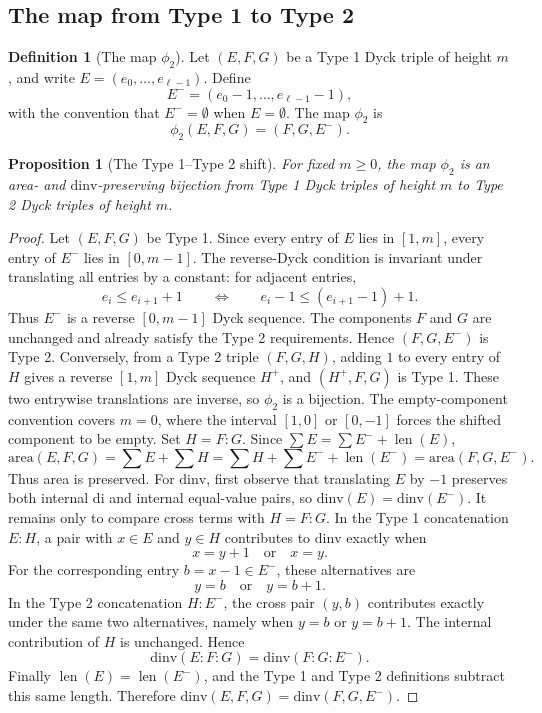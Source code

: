 \documentclass[11pt]{article}
\theoremstyle{plain}
\newtheorem{proposition}[theorem]{Proposition}
\theoremstyle{definition}
\newtheorem{definition}[theorem]{Definition}
\theoremstyle{remark}
\newcommand{\di}{\mathrm{di}}
\newcommand{\dinv}{\mathrm{dinv}}
\newcommand{\area}{\mathrm{area}}
\begin{document}
\subsection{The map from Type 1 to Type 2}
\begin{definition}[The map \(\phi_2\)]
\label{def:phi2}
Let \((E,F,G)\) be a Type 1 Dyck triple of height \(m\), and write
\(E=(e_0,\ldots,e_{\ell-1})\).  Define
\[
  E^-=(e_0-1,\ldots,e_{\ell-1}-1),
\]
with the convention that \(E^-=\emptyset\) when \(E=\emptyset\).  The map
\(\phi_2\) is
\[
  \phi_2(E,F,G)=(F,G,E^-).
\]
\end{definition}
\begin{proposition}[The Type 1--Type 2 shift]
\label{prop:phi2-bijection}
For fixed \(m\ge 0\), the map \(\phi_2\) is an area- and
\(\dinv\)-preserving bijection from Type 1 Dyck triples of height \(m\) to
Type 2 Dyck triples of height \(m\).
\end{proposition}
\begin{proof}
Let \((E,F,G)\) be Type 1.  Since every entry of \(E\) lies in \([1,m]\),
every entry of \(E^-\) lies in \([0,m-1]\).  The reverse-Dyck condition is
invariant under translating all entries by a constant: for adjacent entries,
\[
  e_i\le e_{i+1}+1
  \qquad\Longleftrightarrow\qquad
  e_i-1\le (e_{i+1}-1)+1.
\]
Thus \(E^-\) is a reverse \([0,m-1]\) Dyck sequence.  The components \(F\) and
\(G\) are unchanged and already satisfy the Type 2 requirements.  Hence
\((F,G,E^-)\) is Type 2.  Conversely, from a Type 2 triple \((F,G,H)\), adding
\(1\) to every entry of \(H\) gives a reverse \([1,m]\) Dyck sequence
\(H^+\), and \((H^+,F,G)\) is Type 1.  These two entrywise translations are
inverse, so \(\phi_2\) is a bijection.  The empty-component convention covers
\(m=0\), where the interval \([1,0]\) or \([0,-1]\) forces the shifted
component to be empty.
Set \(H=F:G\).  Since \(\sum E=\sum E^-+\operatorname{len}(E)\),
\[
  \area(E,F,G)=\sum E+\sum H
  =\sum H+\sum E^-+\operatorname{len}(E^-)
  =\area(F,G,E^-).
\]
Thus area is preserved.
For \(\dinv\), first observe that translating \(E\) by \(-1\) preserves both
internal \(\di\) and internal equal-value pairs, so
\(\dinv(E)=\dinv(E^-)\).  It remains only to compare cross terms with
\(H=F:G\).  In the Type 1 concatenation \(E:H\), a pair with \(x\in E\) and
\(y\in H\) contributes to \(\dinv\) exactly when
\[
  x=y+1 \quad\text{or}\quad x=y.
\]
For the corresponding entry \(b=x-1\in E^-\), these alternatives are
\[
  y=b \quad\text{or}\quad y=b+1.
\]
In the Type 2 concatenation \(H:E^-\), the cross pair \((y,b)\) contributes
exactly under the same two alternatives, namely when \(y=b\) or \(y=b+1\).
The internal contribution of \(H\) is unchanged.  Hence
\[
  \dinv(E:F:G)=\dinv(F:G:E^-).
\]
Finally \(\operatorname{len}(E)=\operatorname{len}(E^-)\), and the Type 1 and
Type 2 definitions subtract this same length.  Therefore
\(\dinv(E,F,G)=\dinv(F,G,E^-)\).
\end{proof}
\end{document}
